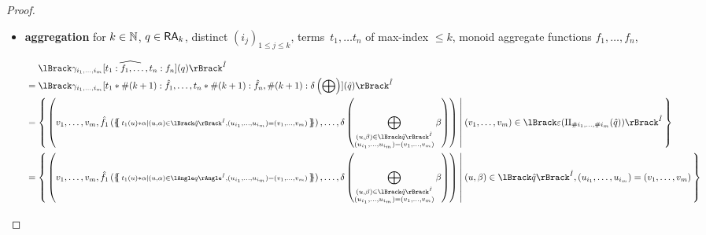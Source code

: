 \begin{proof}
\begin{itemize}
\begin{align*}
				\mset{(u,\alpha)\mid (u,\alpha)\in \ansem{\hat I}{ q_1}, \not\exists\beta\: (u,\beta)\in\ansem{\hat I}{ q_2}
				}
				\uplus
				\mset{\left(u,\alpha\ominus\bigoplus_{\beta\mid
						(u,\beta)\in\ansem{\hat I}{ q_2}}\beta\right)\:\middle|\: (u,\alpha)\in\ansem{\hat I}{ q_1},
				\exists\beta (u,\beta)\in\ansem{\hat I}{ q_2}}                    \\
				       & =                &            &
				\mset{\left(u,\alpha\ominus\bigoplus_{\beta\mid
						(u,\beta)\in\ansem{\hat I}{ q_2}}\beta\right)\:\middle|\: (u,\alpha)\in\ansem{\hat I}{ q_1}
          } =
				     \ansem{\hat I}{q_1-q_2}.
			\end{align*}

		\item \textbf{aggregation} for $k\in\mathbb{N}$,
			$q\in\mathsf{RA}_k$, distinct $(i_j)_{1\leq j\leq k}$,
			terms~$t_1,\dots t_n$
			of max-index $\leq k$, monoid aggregate functions
			$f_1,\dots,f_n$,\\
      \hspace*{-5em}\begin{minipage}{\linewidth}
			\begin{align*}
				 & \phantom{{}={}}\sem{\hat
					I}{\widehat{\gamma_{i_1,\dots,i_m}[t_1:f_1,\dots,t_n:f_n](q)}}
				\\& =\sem{\hat I}{\gamma_{i_1,\dots,i_m}[t_1*\#(k+1):\hat
						f_1,\dots,t_n*\#(k+1):\hat
						f_n,\#(k+1):\delta\left(\bigoplus\right)](\hat q)}
				\\
				 & =\set{\left(v_1,\dots,v_m, \hat f_1\left(\mset{\scriptstyle t_1(u)*\alpha\mid (u,\alpha)\in\sem{\hat
					I}{\hat q},
				(u_{i_1},\dots,u_{i_m})=(v_1,\dots,v_m)}\right),\dots,\delta\left(
				\bigoplus_{\substack{(u,\beta)\in\sem{\hat I}{\hat q}                                      \\(u_{i_1},\dots,u_{i_m})=(v_1,\dots,v_m)}}\beta
				\right)\right)
				\:\middle|\:
				(v_1,\dots,v_m)\in\sem{\hat{I}}{\epsilon(\Pi_{\#i_1,\dots,\#i_m}(\hat q))}}                \\
				 & =\set{\left(v_1,\dots,v_m, \hat
				f_1\left(\mset{\scriptstyle t_1(u)*\alpha\mid (u,\alpha)\in\ansem{\hat
					I}{q},
				(u_{i_1},\dots,u_{i_m})=(v_1,\dots,v_m)}\right),\dots,\delta\left(
				\bigoplus_{\substack{(u,\beta)\in\sem{\hat I}{\hat q}                                      \\(u_{i_1},\dots,u_{i_m})=(v_1,\dots,v_m)}}\beta
				\right)\right)
				\:\middle|\:
				(u,\beta)\in \sem{\hat I}{\hat q}, (u_{i_1},\dots,
				u_{i_m})=(v_1,\dots,v_m)}                                                                  \\

\end{align*}
\end{minipage}
\end{itemize}
\end{proof}
